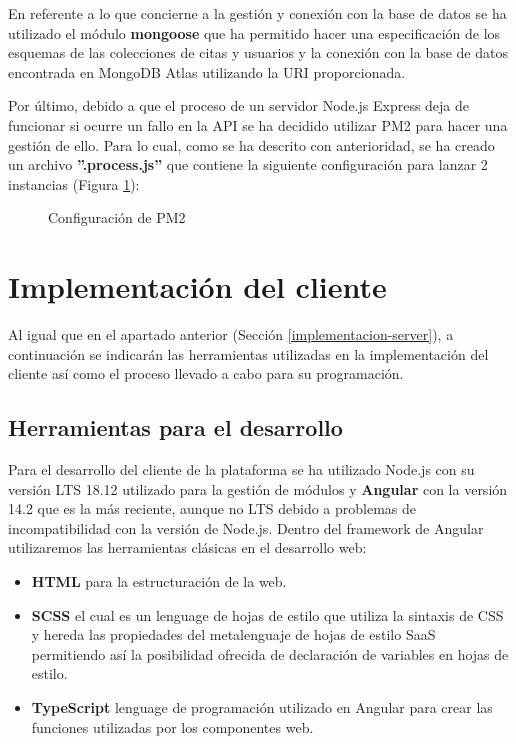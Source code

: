 En referente a lo que concierne a la gestión y conexión con la base de datos se ha utilizado el módulo \textbf{mongoose} que ha permitido hacer una especificación de los esquemas de las colecciones de citas y usuarios y la conexión con la base de datos encontrada en MongoDB Atlas utilizando la URI proporcionada.

Por último, debido a que el proceso de un servidor Node.js Express deja de funcionar si ocurre un fallo en la API se ha decidido utilizar PM2 para hacer una gestión de ello. Para lo cual, como se ha descrito con anterioridad, se ha creado un archivo \textbf{''.process.js''} que contiene la siguiente configuración para lanzar 2 instancias (Figura \ref{fig:pm2}):

\begin{figure}[H]
    \caption{Configuración de PM2}
    \label{fig:pm2}
\end{figure}


\section{Implementación del cliente}
Al igual que en el apartado anterior (Sección \ref{implementacion-server}), a continuación se indicarán las herramientas utilizadas en la implementación del cliente así como el proceso llevado a cabo para su programación. 

\subsection{Herramientas para el desarrollo}
Para el desarrollo del cliente de la plataforma se ha utilizado Node.js con su versión LTS 18.12 utilizado para la gestión de módulos y \textbf{Angular} con la versión 14.2 que es la más reciente, aunque no LTS debido a problemas de incompatibilidad con la versión de Node.js. Dentro del framework de Angular utilizaremos las herramientas clásicas en el desarrollo web: 
 \begin{itemize}
     \item \textbf{HTML} para la estructuración de la web.
     \item \textbf{SCSS} el cual es un lenguage de hojas de estilo que utiliza la sintaxis de CSS y hereda las propiedades del metalenguaje de hojas de estilo SaaS permitiendo así la posibilidad ofrecida de declaración de variables en hojas de estilo. 
     \item \textbf{TypeScript} lenguage de programación utilizado en Angular para crear las funciones utilizadas por los componentes web.
 \end{itemize}

